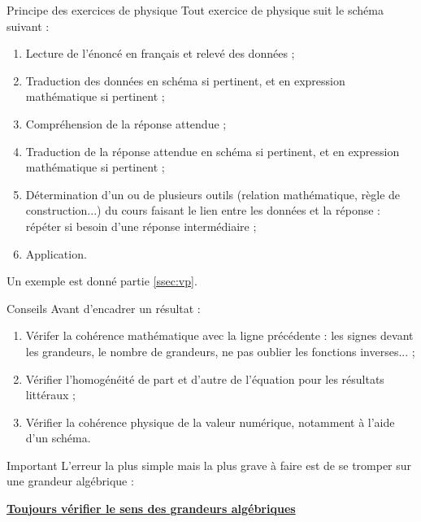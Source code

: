 \documentclass[10pt,a5paper,notitlepage]{book}
\begin{document}
\begin{NCprop}{Principe des exercices de physique}
    Tout exercice de physique suit le schéma suivant :
    \begin{enumerate}
        \item Lecture de l'énoncé en français et relevé des données ;
        \item Traduction des données en schéma si pertinent, et en expression
            mathématique si pertinent ;
        \item Compréhension de la réponse attendue ;
        \item Traduction de la réponse attendue en schéma si pertinent, et en
            expression mathématique si pertinent ;
        \item Détermination d'un ou de plusieurs outils (relation mathématique,
            règle de construction...) du cours faisant le lien entre les données
            et la réponse : répéter si besoin d'une réponse intermédiaire ;
        \item Application.
    \end{enumerate}
    Un exemple est donné partie \ref{ssec:vp}.
\end{NCprop}


\begin{NCcoro}{Conseils}
    Avant d'encadrer un résultat :
    \begin{enumerate}
        \item Vérifer la cohérence mathématique avec la ligne précédente : les
            signes devant les grandeurs, le nombre de grandeurs, ne pas oublier
            les fonctions inverses... ;
        \item Vérifier l'homogénéité de part et d'autre de l'équation pour les
            résultats littéraux ;
        \item Vérifier la cohérence physique de la valeur numérique, notamment à
            l'aide d'un schéma.
    \end{enumerate}
\end{NCcoro}

\begin{NCimpo}{Important}
    L'erreur la plus simple mais la plus grave à faire est de se tromper sur une
    grandeur algébrique :
    \begin{center}
        \textbf{\underline{Toujours vérifier le sens des grandeurs algébriques}}
    \end{center}
\end{NCimpo}
\end{document}
